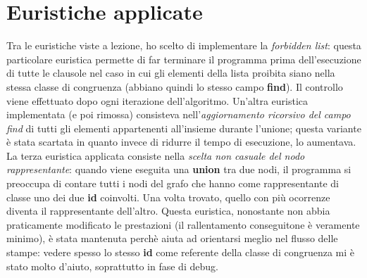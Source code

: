 \section{Euristiche applicate}
Tra le euristiche viste a lezione, ho scelto di implementare la \textit{forbidden list}: questa particolare euristica permette
di far terminare il programma prima dell'esecuzione di tutte le clausole nel caso in cui gli elementi della lista proibita
siano nella stessa classe di congruenza (abbiano quindi lo stesso campo \textbf{find}). Il controllo viene effettuato dopo ogni
iterazione dell'algoritmo. Un'altra euristica implementata (e poi rimossa) consisteva nell'\textit{aggiornamento ricorsivo del campo
find} di tutti gli elementi appartenenti all'insieme durante l'unione; questa variante è stata scartata in
quanto invece di ridurre il tempo di esecuzione, lo aumentava. La terza euristica applicata consiste nella \textit{scelta
non casuale del nodo rappresentante}: quando viene eseguita una \textbf{union} tra due nodi, il programma si preoccupa di contare
tutti i nodi del grafo che hanno come rappresentante di classe uno dei due \textbf{id} coinvolti. Una volta trovato, quello con
più ocorrenze diventa il rappresentante dell'altro. Questa euristica, nonostante non abbia praticamente modificato
le prestazioni (il rallentamento conseguitone è veramente minimo), è stata mantenuta perchè aiuta ad orientarsi meglio nel
flusso delle stampe: vedere spesso lo stesso \textbf{id} come referente della classe di congruenza mi è stato molto
d'aiuto, soprattutto in fase di debug.

